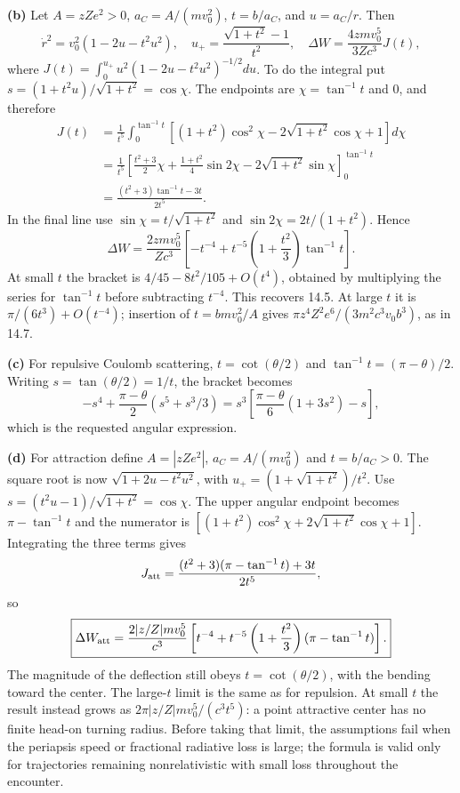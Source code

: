 \textbf{(b)} Let $A=zZe^2>0$, $a_C=A/(mv_0^2)$, $t=b/a_C$, and
$u=a_C/r$. Then
\[
\dot r^2=v_0^2(1-2u-t^2u^2),\quad
u_+=\frac{\sqrt{1+t^2}-1}{t^2},\quad
\Delta W=\frac{4zmv_0^5}{3Zc^3}J(t),
\]
where $J(t)=\int_0^{u_+}u^2(1-2u-t^2u^2)^{-1/2}du$.
To do the integral put
$s=(1+t^2u)/\sqrt{1+t^2}=\cos\chi$.
The endpoints are $\chi=\tan^{-1}t$ and $0$, and therefore
\begin{align*}
J(t)&=\frac1{t^5}\int_0^{\tan^{-1}t}
[(1+t^2)\cos^2\chi-2\sqrt{1+t^2}\cos\chi+1]d\chi\\
&=\frac1{t^5}\left[
\frac{t^2+3}{2}\chi+\frac{1+t^2}{4}\sin2\chi
-2\sqrt{1+t^2}\sin\chi\right]_0^{\tan^{-1}t}\\
&=\frac{(t^2+3)\tan^{-1}t-3t}{2t^5}.
\end{align*}
In the final line use $\sin\chi=t/\sqrt{1+t^2}$ and
$\sin2\chi=2t/(1+t^2)$. Hence
\[
\boxed{\Delta W=\frac{2zmv_0^5}{Zc^3}
\left[-t^{-4}+t^{-5}\left(1+\frac{t^2}3\right)\tan^{-1}t\right].}
\]
At small $t$ the bracket is
$4/45-8t^2/105+O(t^4)$, obtained by multiplying the series for
$\tan^{-1}t$ before subtracting $t^{-4}$. This recovers 14.5.
At large $t$ it is $\pi/(6t^3)+O(t^{-4})$; insertion of
$t=bmv_0^2/A$ gives
$\pi z^4Z^2e^6/(3m^2c^3v_0b^3)$, as in 14.7.

\textbf{(c)} For repulsive Coulomb scattering,
$t=\cot(\theta/2)$ and $\tan^{-1}t=(\pi-\theta)/2$.
Writing $s=\tan(\theta/2)=1/t$, the bracket becomes
\[
-s^4+\frac{\pi-\theta}{2}(s^5+s^3/3)
=s^3\left[\frac{\pi-\theta}{6}(1+3s^2)-s\right],
\]
which is the requested angular expression.

\textbf{(d)} For attraction define $A=|zZe^2|$, $a_C=A/(mv_0^2)$ and
$t=b/a_C>0$. The square root is now $\sqrt{1+2u-t^2u^2}$, with
$u_+=(1+\sqrt{1+t^2})/t^2$. Use
$s=(t^2u-1)/\sqrt{1+t^2}=\cos\chi$. The upper angular endpoint becomes
$\pi-\tan^{-1}t$ and the numerator is
$[(1+t^2)\cos^2\chi+2\sqrt{1+t^2}\cos\chi+1]$.
Integrating the three terms gives
\[
J_{\rm att}=
\frac{(t^2+3)(\pi-\tan^{-1}t)+3t}{2t^5},
\]
so
\[
\boxed{\Delta W_{\rm att}=
\frac{2|z/Z|mv_0^5}{c^3}
\left[t^{-4}+t^{-5}\left(1+\frac{t^2}3\right)
(\pi-\tan^{-1}t)\right].}
\]
The magnitude of the deflection still obeys $t=\cot(\theta/2)$, with
the bending toward the center. The large-$t$ limit is the same as for
repulsion. At small $t$ the result instead grows as
$2\pi|z/Z|mv_0^5/(c^3t^5)$: a point attractive center has no finite
head-on turning radius. Before taking that limit, the assumptions fail
when the periapsis speed or fractional radiative loss is large; the
formula is valid only for trajectories remaining nonrelativistic with
small loss throughout the encounter.

